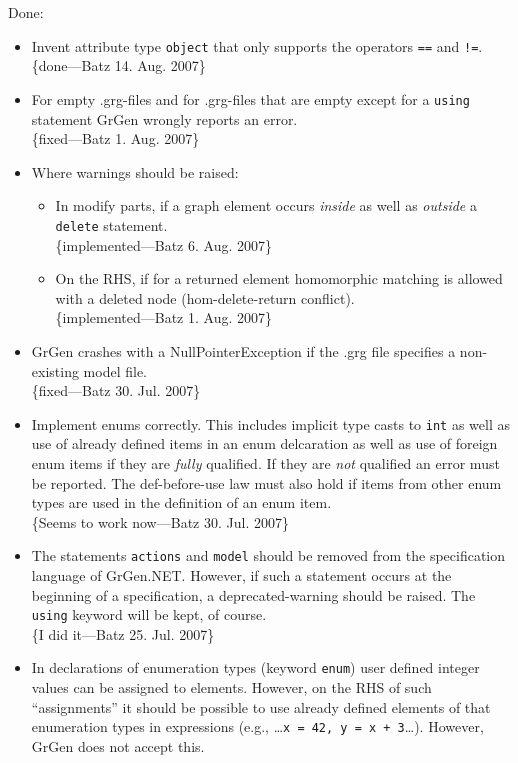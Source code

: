\documentclass[12pt,a4paper]{article}
\begin{document}
\noindent
Done:
\begin{itemize}
	\item Invent attribute type {\tt object} that only supports the operators {\tt ==} and {\tt !=}.\\
		\{done---Batz 14. Aug. 2007\}
	\item For empty .grg-files and for .grg-files that are empty except for a {\tt using} statement GrGen wrongly reports an error.\\
		\{fixed---Batz 1. Aug. 2007\}
	
	\item Where warnings should be raised:
		\begin{itemize}
			\item In modify parts, if a graph element occurs \emph{inside} as well as \emph{outside} a {\tt delete} statement.\\
				\{implemented---Batz 6. Aug. 2007\}
			\item On the RHS, if for a returned element homomorphic matching is allowed with a deleted node (hom-delete-return conflict).\\
				\{implemented---Batz 1. Aug. 2007\}
		\end{itemize}
    \item GrGen crashes with a NullPointerException if the .grg file specifies a non-existing model file.\\
		\{fixed---Batz 30. Jul. 2007\}
	\item Implement enums correctly. This includes implicit type casts to {\tt int} as well as use of already defined items in an enum delcaration as well as use of foreign enum items if they are \emph{fully} qualified.
		If they are \emph{not} qualified an error must be reported.
		The def-before-use law must also hold if items from other enum types are used in the definition of an enum item.\\
		\{Seems to work now---Batz 30. Jul. 2007\}
	\item The statements {\tt actions} and {\tt model} should be removed from the specification language of GrGen.NET.
		However, if such a statement occurs at the beginning of a specification, a deprecated-warning should be raised.
		The {\tt using} keyword will be kept, of course.\\
		\{I did it---Batz 25. Jul. 2007\}
	\item In declarations of enumeration types (keyword {\tt enum}) user defined integer values can be assigned to elements.
	  However, on the RHS of such "`assignments"' it should be possible to use already defined elements of that enumeration types in expressions (e.g., \dots{}{\tt{}x = 42, y = x + 3}\dots). However, GrGen does not accept this.\\

\end{itemize}
\end{document}
